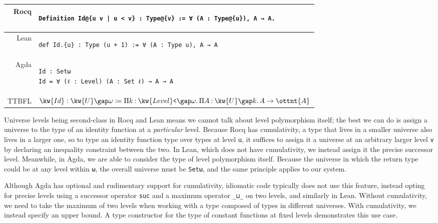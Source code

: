 \documentclass[a4paper,UKenglish,cleveref,autoref,thm-restate]{lipics-v2021}
\makeatletter
\newcommand{\lang}{TTBFL\@\xspace}
\makeatother
\begin{document}
\begin{table}[H]
\begin{tabular}{rp{}}
  Rocq &
  \begin{minipage}[t]{0.69\textwidth}
  \begin{verbatim}
Definition Id@{u v | u < v} : Type@{v} := ∀ (A : Type@{u}), A → A.
  \end{verbatim}
  \end{minipage}
  \\
  \midrule
  Lean &
  \begin{minipage}[t]{0.69\textwidth}
  \begin{verbatim}
def Id.{u} : Type (u + 1) := ∀ (A : Type u), A → A
  \end{verbatim}
  \end{minipage}
  \\
  \midrule
  Agda &
  \begin{minipage}[t]{0.69\textwidth}
  \begin{verbatim}
Id : Setω
Id = ∀ (ℓ : Level) (A : Set ℓ) → A → A
  \end{verbatim}
  \end{minipage}
  \\
  \midrule
  \lang & $\kw{Id} :  \kw{U} \gap   \omega   \coloneq   \Pi  k  \mathbin{:}   \kw{Level}\texttt{<} \gap   \omega    \mathpunct{.}   \Pi  A  \mathbin{:}   \kw{U} \gap  k   \mathpunct{.}  A    \to  \ottnt{A} $
\end{tabular}
\end{table}

Universe levels being second-class in Rocq and Lean means we cannot talk about level polymorphism itself;
the best we can do is assign a universe to the type of an identity function at a \emph{particular} level.
Because Rocq has cumulativity, a type that lives in a smaller universe also lives in a larger one,
so to type an identity function type over types at level \texttt{u},
it suffices to assign it a universe at an arbitrary larger level \texttt{v}
by declaring an inequality constraint between the two.
In Lean, which does not have cumulativity,
we instead assign it the precise successor level.
Meanwhile, in Agda, we are able to consider the type of level polymorphism itself.
Because the universe in which the return type could be at any level within \texttt{ω},
the overall universe must be \texttt{Setω},
and the same principle applies to our system.

Although Agda has optional and rudimentary support for cumulativity,
idiomatic code typically does not use this feature,
instead opting for precise levels using a successor operator \texttt{suc}
and a maximum operator \texttt{_⊔_} on two levels,
and similarly in Lean.
Without cumulativity, we need to take the maximum of two levels
when working with a type composed of types in different universes.
With cumulativity, we instead specify an upper bound.
A type constructor for the type of constant functions at fixed levels demonstrates this use case.
\end{document}
